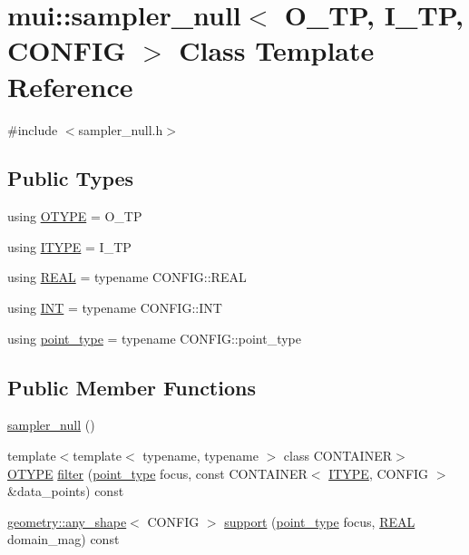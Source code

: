 \hypertarget{classmui_1_1sampler__null}{}\section{mui\+:\+:sampler\+\_\+null$<$ O\+\_\+\+TP, I\+\_\+\+TP, C\+O\+N\+F\+IG $>$ Class Template Reference}
\label{classmui_1_1sampler__null}


{\ttfamily \#include $<$sampler\+\_\+null.\+h$>$}

\subsection*{Public Types}
\begin{DoxyCompactItemize}
\item 
using \hyperlink{classmui_1_1sampler__null_a6f20339fd4ce5f99e6800ab77558f9e9}{O\+T\+Y\+PE} = O\+\_\+\+TP
\item 
using \hyperlink{classmui_1_1sampler__null_a000a82d8a158f0188279e708c2625865}{I\+T\+Y\+PE} = I\+\_\+\+TP
\item 
using \hyperlink{classmui_1_1sampler__null_a00fccc2bca221ca91668d49c771b33bc}{R\+E\+AL} = typename C\+O\+N\+F\+I\+G\+::\+R\+E\+AL
\item 
using \hyperlink{classmui_1_1sampler__null_a2eb2c471860904568cbc260b4402eb73}{I\+NT} = typename C\+O\+N\+F\+I\+G\+::\+I\+NT
\item 
using \hyperlink{classmui_1_1sampler__null_a985eebd74be60f0c554d6ab50914e99b}{point\+\_\+type} = typename C\+O\+N\+F\+I\+G\+::point\+\_\+type
\end{DoxyCompactItemize}
\subsection*{Public Member Functions}
\begin{DoxyCompactItemize}
\item 
\hyperlink{classmui_1_1sampler__null_a4f70aa0cd24e004528d8899568e12b5a}{sampler\+\_\+null} ()
\item 
{\footnotesize template$<$template$<$ typename, typename $>$ class C\+O\+N\+T\+A\+I\+N\+ER$>$ }\\\hyperlink{classmui_1_1sampler__null_a6f20339fd4ce5f99e6800ab77558f9e9}{O\+T\+Y\+PE} \hyperlink{classmui_1_1sampler__null_ade031d5c47cbf05f49e4e958da23f078}{filter} (\hyperlink{classmui_1_1sampler__null_a985eebd74be60f0c554d6ab50914e99b}{point\+\_\+type} focus, const C\+O\+N\+T\+A\+I\+N\+ER$<$ \hyperlink{classmui_1_1sampler__null_a000a82d8a158f0188279e708c2625865}{I\+T\+Y\+PE}, C\+O\+N\+F\+IG $>$ \&data\+\_\+points) const
\item 
\hyperlink{classmui_1_1geometry_1_1any__shape}{geometry\+::any\+\_\+shape}$<$ C\+O\+N\+F\+IG $>$ \hyperlink{classmui_1_1sampler__null_a1d84967f446a79cbe176c78248708536}{support} (\hyperlink{classmui_1_1sampler__null_a985eebd74be60f0c554d6ab50914e99b}{point\+\_\+type} focus, \hyperlink{classmui_1_1sampler__null_a00fccc2bca221ca91668d49c771b33bc}{R\+E\+AL} domain\+\_\+mag) const
\end{DoxyCompactItemize}


